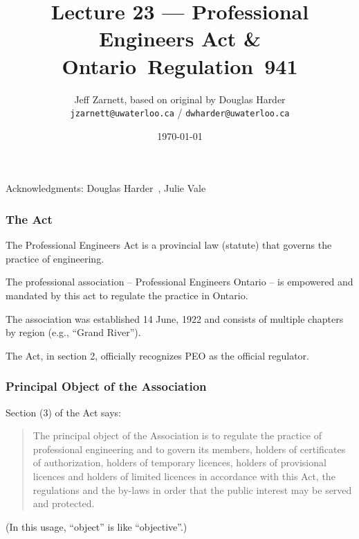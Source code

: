 

\title{Lecture 23 --- Professional Engineers Act \& Ontario~Regulation~941 }

\author{Jeff Zarnett, based on original by Douglas Harder \\ \small \texttt{jzarnett@uwaterloo.ca} / \texttt{dwharder@uwaterloo.ca}}
\date{\today}




\begin{frame}
  \titlepage

\begin{center}
  \small{Acknowledgments: Douglas Harder~\cite{dwh}, Julie Vale~\cite{jv}}
  \end{center}
\end{frame}



\begin{frame}
\frametitle{The Act}

The Professional Engineers Act is a provincial law (statute) that governs the practice of engineering.

The professional association -- Professional Engineers Ontario -- is empowered and mandated by this act to regulate the practice in Ontario.

The association was established 14 June, 1922 and consists of multiple chapters by region (e.g., ``Grand River'').

The Act, in section 2, officially recognizes PEO as the official regulator.

\end{frame}


\begin{frame}
\frametitle{Principal Object of the Association}

Section (3) of the Act says:

\begin{quote}
The principal object of the Association is to regulate the practice of professional engineering and to govern its members, holders of certificates of authorization, holders of temporary licences, holders of provisional licences and holders of limited licences in accordance with this Act, the regulations and the by-laws in order that the public interest may be served and protected. 
\end{quote}

(In this usage, ``object'' is like ``objective''.)

\end{frame}



